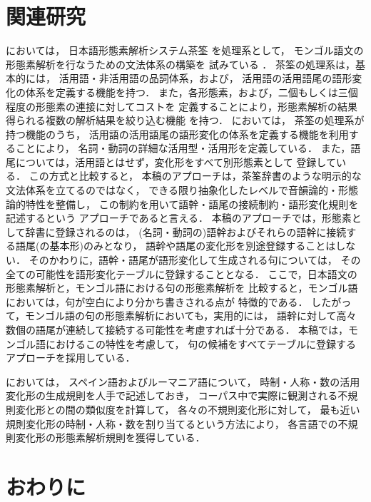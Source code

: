 \section{関連研究}
\label{sec:related}

\cite{Ehara04aj}においては，
日本語形態素解析システム茶筌
を処理系として，
モンゴル語文の形態素解析を行なうための文法体系の構築を
試みている
．
茶筌の処理系は，基本的には，
活用語・非活用語の品詞体系，および，
活用語の活用語尾の語形変化の体系を定義する機能を持つ．
また，各形態素，および，二個もしくは三個程度の形態素の連接に対してコストを
定義することにより，形態素解析の結果得られる複数の解析結果を絞り込む機能
を持つ．
\cite{Ehara04aj}においては，
茶筌の処理系が持つ機能のうち，
活用語の活用語尾の語形変化の体系を定義する機能を利用することにより，
名詞・動詞の詳細な活用型・活用形を定義している．
また，語尾については，活用語とはせず，変化形をすべて別形態素として
登録している．
この方式と比較すると，
本稿のアプローチは，茶筌辞書のような明示的な文法体系を立てるのではなく，
できる限り抽象化したレベルで音韻論的・形態論的特性を整備し，
この制約を用いて語幹・語尾の接続制約・語形変化規則を記述するという
アプローチであると言える．
本稿のアプローチでは，形態素として辞書に登録されるのは，
(名詞・動詞の)語幹およびそれらの語幹に接続する語尾(の基本形)のみとなり，
語幹や語尾の変化形を別途登録することはしない．
そのかわりに，語幹・語尾が語形変化して生成される句については，
その全ての可能性を語形変化テーブルに登録することとなる．
ここで，日本語文の形態素解析と，モンゴル語における句の形態素解析を
比較すると，モンゴル語においては，句が空白により分かち書きされる点が
特徴的である．
したがって，モンゴル語の句の形態素解析においても，実用的には，
語幹に対して高々数個の語尾が連続して接続する可能性を考慮すれば十分である．
本稿では，モンゴル語におけるこの特性を考慮して，
句の候補をすべてテーブルに登録するアプローチを採用している．

\cite{Cucerzan02a}においては，
スペイン語およびルーマニア語について，
時制・人称・数の活用変化形の生成規則を人手で記述しておき，
コーパス中で実際に観測される不規則変化形との間の類似度を計算して，
各々の不規則変化形に対して，
最も近い規則変化形の時制・人称・数を割り当てるという方法により，
各言語での不規則変化形の形態素解析規則を獲得している．


\section{おわりに}

